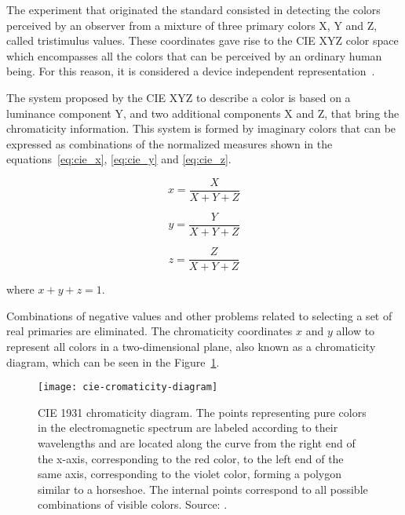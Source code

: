 The experiment that originated the standard consisted in detecting the colors perceived by an observer from a mixture of three primary colors X, Y and Z, called tristimulus values. These coordinates gave rise to the CIE XYZ color space which encompasses all the colors that can be perceived by an ordinary human being. For this reason, it is considered a device independent representation~\citep{konstantinos:00}.

The system proposed by the CIE XYZ to describe a color is based on a luminance component Y, and two additional components X and Z, that bring the chromaticity information. This system is formed by imaginary colors that can be expressed as combinations of the normalized measures shown in the equations~\ref{eq:cie_x}, \ref{eq:cie_y} and \ref{eq:cie_z}.

\begin{equation}
  x = \frac{X}{X + Y + Z}
\label{eq:cie_x}
\end{equation}

\begin{equation}
  y = \frac{Y}{X + Y + Z}
\label{eq:cie_y}
\end{equation}

\begin{equation}
  z = \frac{Z}{X + Y + Z}
\label{eq:cie_z}
\end{equation}

where $x + y+ z = 1$.

Combinations of negative values and other problems related to selecting a set of real primaries are eliminated. The chromaticity coordinates $x$ and $y$ allow to represent all colors in a two-dimensional plane, also known as a chromaticity diagram, which can be seen in the Figure~\ref{fig:cie-cromaticity-diagram}.

\begin{figure}[!ht]
  \centering
  \texttt{[image: cie-cromaticity-diagram]}
  \caption[CIE 1931 chromaticity diagram]{CIE 1931 chromaticity diagram. The points representing pure colors in the electromagnetic spectrum are labeled according to their wavelengths and are located along the curve from the right end of the x-axis, corresponding to the red color, to the left end of the same axis, corresponding to the violet color, forming a polygon similar to a horseshoe. The internal points correspond to all possible combinations of visible colors. Source: \citet{ben:09}.}
  \label{fig:cie-cromaticity-diagram} 
\end{figure}

